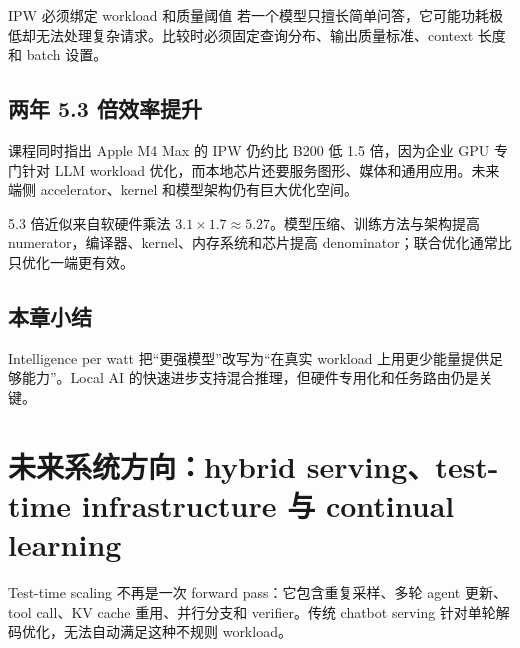 \documentclass[a4paper]{article}
\begin{document}

\begin{warningbox}{IPW 必须绑定 workload 和质量阈值}
若一个模型只擅长简单问答，它可能功耗极低却无法处理复杂请求。比较时必须固定查询分布、输出质量标准、context 长度和 batch 设置。
\end{warningbox}

\subsection{两年 5.3 倍效率提升}


课程同时指出 Apple M4 Max 的 IPW 仍约比 B200 低 1.5 倍，因为企业 GPU 专门针对 LLM workload 优化，而本地芯片还要服务图形、媒体和通用应用。未来端侧 accelerator、kernel 和模型架构仍有巨大优化空间。

\begin{knowledgebox}{5.3 倍近似来自软硬件乘法}
$3.1\times1.7\approx5.27$。模型压缩、训练方法与架构提高 numerator，编译器、kernel、内存系统和芯片提高 denominator；联合优化通常比只优化一端更有效。
\end{knowledgebox}

\subsection{本章小结}

Intelligence per watt 把“更强模型”改写为“在真实 workload 上用更少能量提供足够能力”。Local AI 的快速进步支持混合推理，但硬件专用化和任务路由仍是关键。

\section{未来系统方向：hybrid serving、test-time infrastructure 与 continual learning}


Test-time scaling 不再是一次 forward pass：它包含重复采样、多轮 agent 更新、tool call、KV cache 重用、并行分支和 verifier。传统 chatbot serving 针对单轮解码优化，无法自动满足这种不规则 workload。
\end{document}
